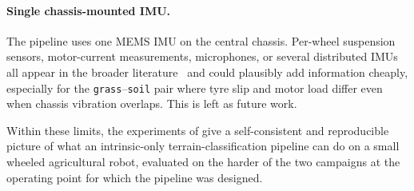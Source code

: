 \paragraph{Single chassis-mounted IMU.} The pipeline uses one MEMS IMU on the central chassis. Per-wheel suspension sensors, motor-current measurements, microphones, or several distributed IMUs all appear in the broader literature~\cite{DuPont2008,Ojeda2006,Bermudez2012} and could plausibly add information cheaply, especially for the \texttt{grass}--\texttt{soil} pair where tyre slip and motor load differ even when chassis vibration overlaps. This is left as future work.

Within these limits, the experiments of  give a self-consistent and reproducible picture of what an intrinsic-only terrain-classification pipeline can do on a small wheeled agricultural robot, evaluated on the harder of the two campaigns at the operating point for which the pipeline was designed.